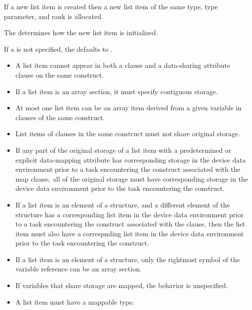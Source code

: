 {{{{\fortranspecificstart
If a new list item is created then a new list item of the same type, type parameter, and
rank is allocated.
\fortranspecificend

The  determines how the new list item is initialized.

If a  is not specified, the  defaults to .

\restrictions
\begin{itemize}

\item A list item cannot appear in both a  clause and a data-sharing attribute clause on the same construct.

\item If a list item is an array section, it must specify contiguous storage.

\item At most one list item can be an array item derived from a given variable in 
clauses of the same construct.

\item List items of  clauses in the same construct must not share original storage.

\item If any part of the original storage of a list item with a predetermined or
explicit data-mapping attribute has corresponding storage in the device data
environment prior to a task encountering the construct associated with the map
clause, all of the original storage must have corresponding storage
in the device data environment prior to the task encountering the construct.

\item If a list item is an element of a structure, and a different element 
of the structure has a corresponding list item in the device data environment 
prior to a task encountering the construct associated with the  
clause, then the list item must also have a correspnding list item in the 
device data environment prior to the task encountering the construct.

\item If a list item is an element of a structure, only the rightmost symbol of the variable reference can be an array section.

\item If variables that share storage are mapped, the behavior is unspecified. 

\item A list item must have a mappable type.


\end{itemize}}}}}
